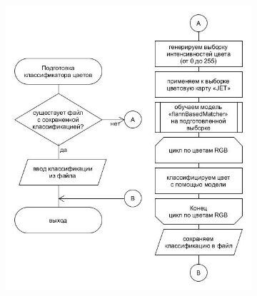\documentclass[t]{beamer}
\begin{document}
	\begin{frame}
		\vspace*{-0.35cm}
		\begin{figure}[ht!]
			\begin{subfigure}{.47\textwidth}
				\centering
				\includegraphics[width = \textwidth]{image/chapter_2/colorclassification}
				\caption{}
			\end{subfigure}
			\begin{subfigure}{.21\textwidth}
				\centering

\end{subfigure}
\end{figure}
\end{frame}
\end{document}
